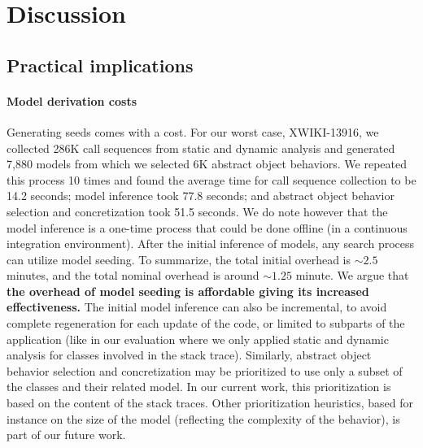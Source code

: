 

\section{Discussion}\label{sec:model_seeding:discussion}

\subsection{Practical implications}

\paragraph{Model derivation costs} Generating seeds comes with a cost. %
%
For our worst case, XWIKI-13916, we collected 286K call sequences from static and dynamic analysis and generated 7,880 models from which we selected 6K abstract object behaviors. We repeated this process 10 times and found the average time for call sequence collection to be 14.2 seconds; model inference took 77.8 seconds; and abstract object behavior selection and concretization took 51.5 seconds. We do note however that the model inference is a one-time process that could be done offline (in a continuous integration environment). After the initial inference of models, any search process can utilize model seeding. To summarize, the total initial overhead is $\sim2.5$ minutes, and the total nominal overhead is around $\sim1.25$ minute.
%
We argue that \textbf{the overhead of model seeding is affordable giving its increased effectiveness. }
%
The initial model inference can also be incremental, to avoid complete regeneration for each update of the code, or limited to subparts of the application (like in our evaluation where we only applied static and dynamic analysis for classes involved in the stack trace).
%
Similarly, abstract object behavior selection and concretization may be prioritized to use only a subset of the classes and their related model. In our current work, this prioritization is based on the content of the stack traces. Other prioritization heuristics, based for instance on the size of the model (reflecting the complexity of the behavior), is part of our future work.

